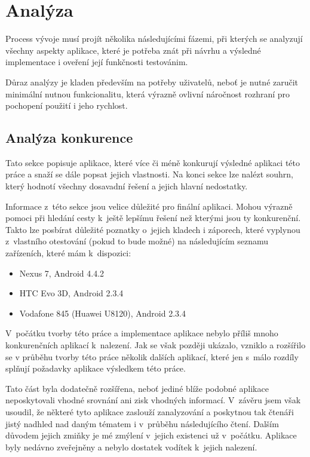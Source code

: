 \documentclass[thesis=B,czech]{FITthesis}[2013/10/20]
\begin{document}
\chapter{Analýza}

Process vývoje musí projít několika následujícími fázemi, při kterých se analyzují všechny aspekty aplikace, které je potřeba znát při návrhu a výsledné implementace i oveření její funkčnosti testovánim. 

Důraz analýzy je kladen především na potřeby uživatelů, neboť je nutné zaručit minimální nutnou funkcionalitu, která výrazně ovlivní náročnost rozhraní pro pochopení použití i jeho rychlost.

\section{Analýza konkurence}

Tato sekce popisuje aplikace, které více či méně konkurují výsledné aplikaci této práce a snaží se dále popsat jejich vlastnosti. Na konci sekce lze nalézt souhrn, který hodnotí všechny dosavadní řešení a jejich hlavní nedostatky.

Informace z~této sekce jsou velice důležité pro finální aplikaci. Mohou výrazně pomoci při hledání cesty k~ještě lepšímu řešení než kterými jsou ty konkurenční. Takto lze posbírat důležité poznatky o~jejich kladech i záporech, které vyplynou z~vlastního otestování (pokud to bude možné) na následujícím seznamu zařízeních, které mám k~dispozici:
\begin{itemize}
  \item{Nexus 7, Android 4.4.2}
  \item{HTC Evo 3D, Android 2.3.4}
  \item{Vodafone 845 (Huawei U8120), Android 2.3.4}
\end{itemize}

V~počátku tvorby této práce a implementace aplikace nebylo příliš mnoho konkurenčních aplikací k~nalezení. Jak se však později ukázalo, vzniklo a rozšířilo se v průběhu tvorby této práce několik dalších aplikací, které jen s~málo rozdíly splňují požadavky aplikace výsledkem této práce.

Tato část byla dodatečně rozšířena, neboť jediné blíže podobné aplikace neposkytovali vhodné srovnání ani zisk vhodných informací. V~závěru jsem však usoudil, že některé tyto aplikace zaslouží zanalyzování a poskytnou tak čtenáři jistý nadhled nad daným tématem i v~průběhu následujícího čtení. Dalším důvodem jejich zmiňky je mé zmýlení v~jejich existenci už v~počátku. Aplikace byly nedávno zveřejněny a nebylo dostatek vodítek k~jejich nalezení.
\end{document}
